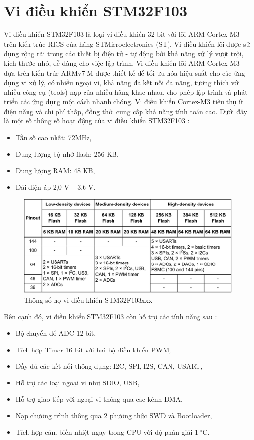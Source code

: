 \section{Vi điều khiển STM32F103}
Vi điều khiển STM32F103 là loại vi điều khiển 32 bit với lõi ARM Cortex-M3 trên kiến trúc RICS của hãng STMicroelectronics (ST). Vi điều khiển lõi được sử dụng rộng rãi trong các thiết bị điện tử - tự động bởi khả năng xử lý vượt trội, kích thước nhỏ, dễ dàng cho việc lập trình. Vi điều khiển lõi ARM Cortex-M3 dựa trên kiến trúc ARMv7-M được thiết kế để tối ưu hóa hiệu suất cho các ứng dụng vi xử lý, có nhiều ngoại vi, khả năng đa kết nối đa năng, tương thích với nhiều công cụ (tools) nạp của nhiều hãng khác nhau, cho phép lập trình và phát triển các ứng dụng một cách nhanh chóng. Vi điều khiển Cortex-M3 tiêu thụ ít điện năng và chi phí thấp, đồng thời cung cấp khả năng tính toán cao. Dưới đây là một số thông số hoạt động của vi điều khiển STM32F103 \cite{9}{}:
\begin{itemize}
\item Tần số cao nhất: 72MHz,
\item Dung lượng bộ nhớ flash: 256 KB,
\item Dung lượng RAM: 48 KB,
\item Dải điện áp 2,0 V – 3,6 V.
\end{itemize}
\begin{center}
    \begin{figure}[h]
    \begin{center}
     \includegraphics[scale=0.3]{image/bang2_2}
    \end{center}
    \caption{Thông số họ vi điều khiển STM32F103xxx \cite{9}}
    \label{refhinh2_9}
    \end{figure}
\end{center}
\par 
Bên cạnh đó, vi điều khiển STM32F103 còn hỗ trợ các tính năng sau \cite{9}:
\begin{itemize}
\item Bộ chuyển đổ ADC 12-bit,
\item Tích hợp Timer 16-bit với hai bộ điều khiển PWM,
\item Đầy đủ các kết nối thông dụng: I2C, SPI, I2S, CAN, USART,
\item Hỗ trợ các loại ngoại vi như SDIO, USB,
\item Hỗ trợ giao tiếp với ngoại vi thông qua các kênh DMA,
\item Nạp chương trình thông qua 2 phương thức SWD và Bootloader,
\item Tích hợp cảm biến nhiệt ngay trong CPU với độ phân giải 1 $^{\circ}$C.
\end{itemize} 
